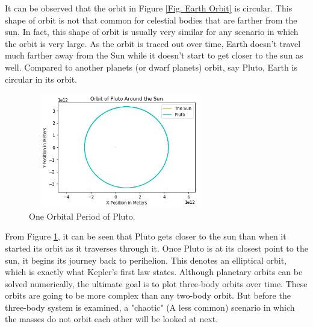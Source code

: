 \documentclass[twocolumn]{article}
\begin{document}
\par \noindent
It can be observed that the orbit in Figure \ref{Fig. Earth Orbit} is circular. This shape of orbit is not that common for celestial bodies that are farther from the sun. In fact, this shape of orbit is usually very similar for any scenario in which the orbit is very large. As the orbit is traced out over time, Earth doesn't travel much farther away from the Sun while it doesn't start to get closer to the sun as well. Compared to another planets (or dwarf planets) orbit, say Pluto, Earth is circular in its orbit.
\begin{figure}[ht]
    \centering
    \includegraphics[width=8cm, height=5cm]{Figures/FP Pluto Orbit.png}
    \caption{\small{One Orbital Period of Pluto.}}
    \label{Fig. Pluto Orbit}
\end{figure}
\par \noindent
From Figure \ref{Fig. Pluto Orbit}, it can be seen that Pluto gets closer to the sun than when it started its orbit as it traverses through it. Once Pluto is at its closest point to the sun, it begins its journey back to perihelion. This denotes an elliptical orbit, which is exactly what Kepler's first law states. Although planetary orbits can be solved numerically, the ultimate goal is to plot three-body orbits over time. These orbits are going to be more complex than any two-body orbit. But before the three-body system is examined, a "chaotic" (A less common) scenario in which the masses do not orbit each other will be looked at next.
\end{document}

